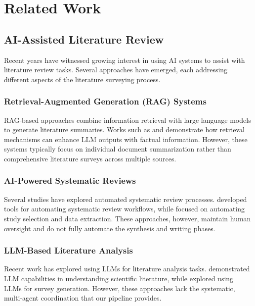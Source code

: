 \section{Related Work}

\subsection{AI-Assisted Literature Review}

Recent years have witnessed growing interest in using AI systems to assist with literature review tasks. Several approaches have emerged, each addressing different aspects of the literature surveying process.

\subsubsection{Retrieval-Augmented Generation (RAG) Systems}

RAG-based approaches combine information retrieval with large language models to generate literature summaries. Works such as \cite{lewis2019retrieval} and \cite{guu2020retrieval} demonstrate how retrieval mechanisms can enhance LLM outputs with factual information. However, these systems typically focus on individual document summarization rather than comprehensive literature surveys across multiple sources.

\subsubsection{AI-Powered Systematic Reviews}

Several studies have explored automated systematic review processes. \cite{marshall2017automation} developed tools for automating systematic review workflows, while \cite{van2019automation} focused on automating study selection and data extraction. These approaches, however, maintain human oversight and do not fully automate the synthesis and writing phases.

\subsubsection{LLM-Based Literature Analysis}

Recent work has explored using LLMs for literature analysis tasks. \cite{wang2023large} demonstrated LLM capabilities in understanding scientific literature, while \cite{liu2023survey} explored using LLMs for survey generation. However, these approaches lack the systematic, multi-agent coordination that our pipeline provides.

